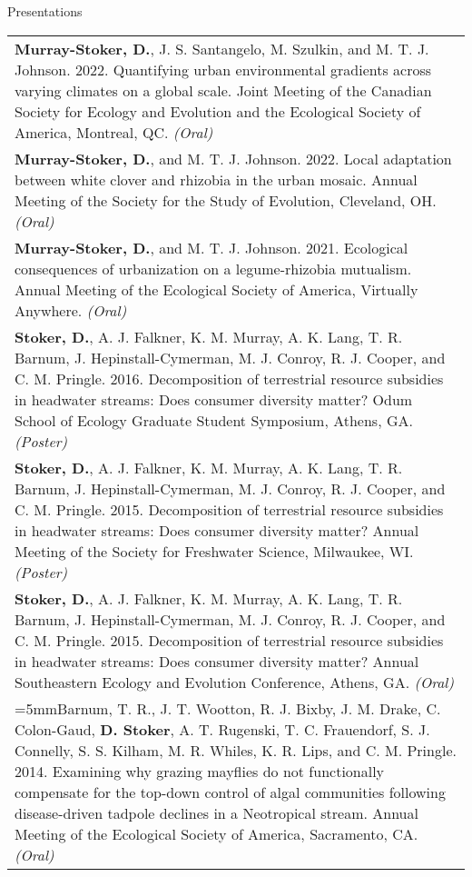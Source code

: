 \documentclass[letterpaper,11pt,oneside]{article}
\begin{document}
\bigskip



\pagebreak

\noindent\Large{Presentations}  
\normalsize
\bigskip

\def\arraystretch{1.4}
\noindent \begin{longtable}{@{} >{\raggedright\arraybackslash}p{17.2cm}}
\hangindent=5mm\textbf{Murray-Stoker, D.}, J. S. Santangelo, M. Szulkin, and M. T. J. Johnson. 2022. Quantifying urban environmental gradients across varying climates on a global scale. Joint Meeting of the Canadian Society for Ecology and Evolution and the Ecological Society of America, Montreal, QC. \textit{(Oral)} \\
\hangindent=5mm\textbf{Murray-Stoker, D.}, and M. T. J. Johnson. 2022. Local adaptation between white clover and rhizobia in the urban mosaic. Annual Meeting of the Society for the Study of Evolution, Cleveland, OH. \textit{(Oral)} \\
\hangindent=5mm\textbf{Murray-Stoker, D.}, and M. T. J. Johnson. 2021. Ecological consequences of urbanization on a legume-rhizobia mutualism. Annual Meeting of the Ecological Society of America, Virtually Anywhere. \textit{(Oral)} \\
\hangindent=5mm\textbf{Stoker, D.}, A. J. Falkner, K. M. Murray, A. K. Lang, T. R. Barnum, J. Hepinstall-Cymerman, M. J. Conroy, R. J. Cooper, and C. M. Pringle. 2016. Decomposition of terrestrial resource subsidies in headwater streams: Does consumer diversity matter? Odum School of Ecology Graduate Student Symposium, Athens, GA. \textit{(Poster)} \\
\hangindent=5mm\textbf{Stoker, D.}, A. J. Falkner, K. M. Murray, A. K. Lang, T. R. Barnum, J. Hepinstall-Cymerman, M. J. Conroy, R. J. Cooper, and C. M. Pringle. 2015. Decomposition of terrestrial resource subsidies in headwater streams: Does consumer diversity matter? Annual Meeting of the Society for Freshwater Science, Milwaukee, WI. \textit{(Poster)} \\
\hangindent=5mm\textbf{Stoker, D.}, A. J. Falkner, K. M. Murray, A. K. Lang, T. R. Barnum, J. Hepinstall-Cymerman, M. J. Conroy, R. J. Cooper, and C. M. Pringle. 2015. Decomposition of terrestrial resource subsidies in headwater streams: Does consumer diversity matter? Annual Southeastern Ecology and Evolution Conference, Athens, GA. \textit{(Oral)} \\
\hangindent=5mmBarnum, T. R., J. T. Wootton, R. J. Bixby, J. M. Drake, C. Colon-Gaud, \textbf{D. Stoker}, A. T. Rugenski, T. C. Frauendorf, S. J. Connelly, S. S. Kilham, M. R. Whiles, K. R. Lips, and C. M. Pringle. 2014. Examining why grazing mayflies do not functionally compensate for the top-down control of algal communities following disease-driven tadpole declines in a Neotropical stream. Annual Meeting of the Ecological Society of America, Sacramento, CA. \textit{(Oral)}
\end{longtable}
\end{document}
